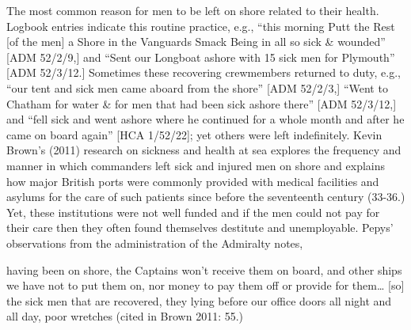 \begin{styleStandard}
The most common reason for men to be left on shore related to their health. Logbook entries indicate this routine practice, e.g., “this morning Putt the Rest [of the men] a Shore in the Vanguards Smack Being in all so sick \& wounded” [ADM 52/2/9,] and “Sent our Longboat ashore with 15 sick men for Plymouth” [ADM 52/3/12.] Sometimes these recovering crewmembers returned to duty, e.g., “our tent and sick men came aboard from the shore” [ADM 52/2/3,] “Went to Chatham for water \& for men that had been sick ashore there” [ADM 52/3/12,] and “fell sick and went ashore where he continued for a whole month and after he came on board again” [HCA 1/52/22]; yet others were left indefinitely. Kevin Brown’s (2011) research on sickness and health at sea explores the frequency and manner in which commanders left sick and injured men on shore and explains how major British ports were commonly provided with medical facilities and asylums for the care of such patients since before the seventeenth century (33-36.) Yet, these institutions were not well funded and if the men could not pay for their care then they often found themselves destitute and unemployable. Pepys’ observations from the administration of the Admiralty notes, 
\end{styleStandard}

\begin{styleStandard}
having been on shore, the Captains won’t receive them on board, and other ships we have not to put them on, nor money to pay them off or provide for them… [so] the sick men that are recovered, they lying before our office doors all night and all day, poor wretches (cited in Brown 2011: 55.) 
\end{styleStandard}

